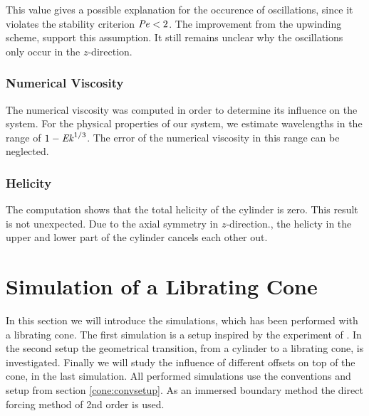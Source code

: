 This value gives a possible explanation for the occurence of oscillations,
since it violates the stability criterion $\mbox{\textit{Pe}}<2$.
The improvement from the upwinding scheme, support this assumption.
It still remains unclear why the oscillations only occur in the $z$-direction.

\subsubsection{Numerical Viscosity}

The numerical viscosity was computed in order to determine its influence on the system.
For the physical properties of our system, we estimate wavelengths in the range of $1 - \mbox{\textit{Ek}}^{1/3}$.
The error of the numerical viscosity in this range can be neglected.

\subsubsection{Helicity}

The computation shows that the total helicity of the cylinder is zero.
This result is not unexpected.
Due to the axial symmetry in $z$-direction., the helicty in the upper and lower part of the cylinder cancels each other out.

\newpage

\section{Simulation of a Librating Cone}

In this section we will introduce the simulations, which has been performed
with a librating cone. The first simulation is a setup inspired by the experiment of \citep{Beardsley1970}.
In the second setup the geometrical transition, from a cylinder to a librating cone, is investigated.
Finally we will study the influence of different offsets on top of the cone, in the last simulation.
All performed simulations use the conventions and setup from section \ref{cone:convsetup}.
As an immersed boundary method the direct forcing  method of 2nd order is used.

